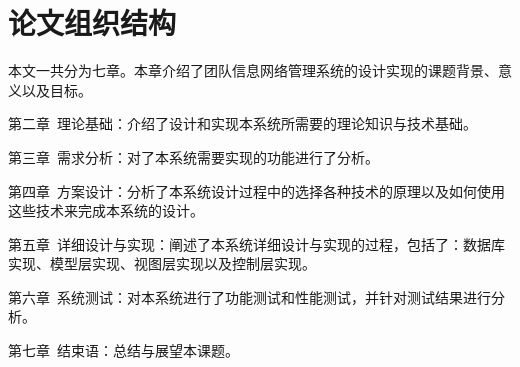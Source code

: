\section{论文组织结构}

本文一共分为七章。本章介绍了团队信息网络管理系统的设计实现的课题背景、意义以及目标。

第二章~理论基础：介绍了设计和实现本系统所需要的理论知识与技术基础。

第三章~需求分析：对了本系统需要实现的功能进行了分析。

第四章~方案设计：分析了本系统设计过程中的选择各种技术的原理以及如何使用这些技术来完成本系统的设计。

第五章~详细设计与实现：阐述了本系统详细设计与实现的过程，包括了：数据库实现、模型层实现、视图层实现以及控制层实现。

第六章~系统测试：对本系统进行了功能测试和性能测试，并针对测试结果进行分析。

第七章~结束语：总结与展望本课题。